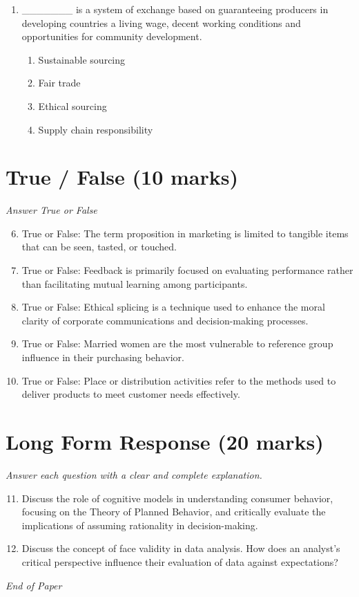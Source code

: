 \documentclass[12pt]{article}
\begin{document}
\begin{enumerate}[label=\arabic*.]
\begin{enumerate}[label=(\alph*)]
    \item Personality conflicts
\end{enumerate}
\item \_\_\_\_\_\_\_ is a system of exchange based on guaranteeing producers in developing countries a living wage, decent working conditions and opportunities for community development.
\begin{enumerate}[label=(\alph*)]
    \item Sustainable sourcing
    \item Fair trade
    \item Ethical sourcing
    \item Supply chain responsibility
\end{enumerate}
\end{enumerate}

\section*{True / False (10 marks)}
\textit{Answer True or False}
\begin{enumerate}[label=\arabic*.]
\setcounter{enumi}{5}
\item True or False: The term proposition in marketing is limited to tangible items that can be seen, tasted, or touched.
\item True or False: Feedback is primarily focused on evaluating performance rather than facilitating mutual learning among participants.
\item True or False: Ethical splicing is a technique used to enhance the moral clarity of corporate communications and decision-making processes.
\item True or False: Married women are the most vulnerable to reference group influence in their purchasing behavior.
\item True or False: Place or distribution activities refer to the methods used to deliver products to meet customer needs effectively.
\end{enumerate}

\section*{Long Form Response (20 marks)}
\textit{Answer each question with a clear and complete explanation.}
\begin{enumerate}[label=\arabic*.]
\setcounter{enumi}{10}
\item Discuss the role of cognitive models in understanding consumer behavior, focusing on the Theory of Planned Behavior, and critically evaluate the implications of assuming rationality in decision-making.
\item Discuss the concept of face validity in data analysis. How does an analyst's critical perspective influence their evaluation of data against expectations?
\end{enumerate}

\vfill
\noindent\textit{End of Paper}
\end{document}
